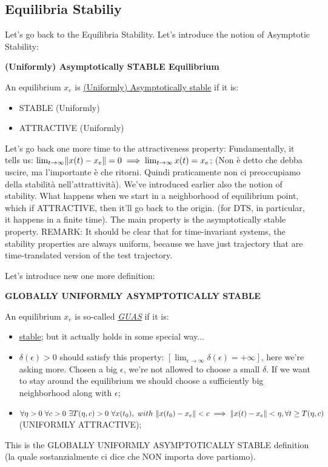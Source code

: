 \subsection*{Equilibria Stabiliy}

Let's go back to the Equilibria Stability. Let's introduce the notion of Asymptotic Stability:

\begin{defn}{\textbf{(Uniformly) Asymptotically STABLE Equilibrium}}

An equilibrium $x_e$ is \underline{(Uniformly) Asymptotically stable} if it is:
\begin{itemize}
\item STABLE (Uniformly)
\item ATTRACTIVE (Uniformly)
\end{itemize}
\end{defn}

Let's go back one more time to the attractiveness property: Fundamentally, it tells us: $\lim_{t\to\infty}\lVert x(t)-x_e\rVert=0 \implies \lim_{t\to\infty}x(t)=x_e$; (Non è detto che debba uscire, ma l'importante è che ritorni. Quindi praticamente non ci preoccupiamo della stabilità nell'attrattività).
We've introduced earlier also the notion of stability. What happens when we start in a neighborhood of equilibrium point, which if ATTRACTIVE, then it'll go back to the origin. (for DTS, in particular, it happens in a finite time). The main property is the asymptotically stable property.
REMARK: It should be clear that for time-invariant systems, the stability properties are always uniform, because we have just trajectory that are time-translated version of the test trajectory.

Let's introduce new one more definition:

\begin{defn}{\textbf{GLOBALLY UNIFORMLY ASYMPTOTICALLY STABLE}}

An equilibrium $x_e$ is so-called \underline{\emph{GUAS}} if it is:
\begin{itemize}
\item \underline{stable}; but it actually holds in some special way...
\item $\delta(\epsilon) > 0$ should satisfy this property: $[\lim_{\epsilon\to\infty}\delta(\epsilon) = +\infty]$, here we're asking more. Chosen a big $\epsilon$, we're not allowed to choose a small $\delta$. If we want to stay around the equilibrium we should choose a sufficiently big neighborhood along with $\epsilon$;
\item $\forall \eta > 0\ \forall c > 0\ \exists T(\eta,c) > 0\ \forall x(t_0),\ with\ \norma{x(t_0)-x_e} < c \implies \norma{x(t)-x_e} < \eta, \forall t \geq T(\eta,c)$ (UNIFORMLY ATTRACTIVE);
\end{itemize}
This is the GLOBALLY UNIFORMLY ASYMPTOTICALLY STABLE definition (la quale sostanzialmente ci dice che NON importa dove partiamo).
\end{defn}

